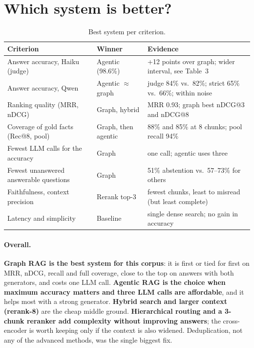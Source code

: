 \documentclass[11pt,a4paper]{article}
\begin{document}
\section{Which system is better?}
\begin{table}[h]\centering\small
\caption{Best system per criterion.}
\begin{tabular}{@{}p{5.6cm}p{3.1cm}p{6.2cm}@{}}\toprule
Criterion & Winner & Evidence\\\midrule
Answer accuracy, Haiku (judge) & Agentic (98.6\%) & +12 points over graph; wider interval, see Table~3\\
Answer accuracy, Qwen & Agentic $\approx$ graph & judge 84\% vs.\ 82\%; strict 65\% vs.\ 66\%; within noise\\
Ranking quality (MRR, nDCG) & Graph, hybrid & MRR 0.93; graph best nDCG@3 and nDCG@8\\
Coverage of gold facts (Rec@8, pool) & Graph, then agentic & 88\% and 85\% at 8 chunks; pool recall 94\%\\
Fewest LLM calls for the accuracy & Graph & one call; agentic uses three\\
Fewest unanswered answerable questions & Graph & 51\% abstention vs.\ 57--73\% for others\\
Faithfulness, context precision & Rerank top-3 & fewest chunks, least to misread (but least complete)\\
Latency and simplicity & Baseline & single dense search; no gain in accuracy\\
\bottomrule\end{tabular}
\end{table}

\paragraph{Overall.} \textbf{Graph RAG is the best system for this corpus}: it is first or tied for first on MRR, nDCG, recall and full coverage, close to the top on answers with both generators, and costs one LLM call. \textbf{Agentic RAG is the choice when maximum accuracy matters and three LLM calls are affordable}, and it helps most with a strong generator. \textbf{Hybrid search and larger context (rerank-8)} are the cheap middle ground. \textbf{Hierarchical routing and a 3-chunk reranker add complexity without improving answers}; the cross-encoder is worth keeping only if the context is also widened. Deduplication, not any of the advanced methods, was the single biggest fix.
\end{document}
